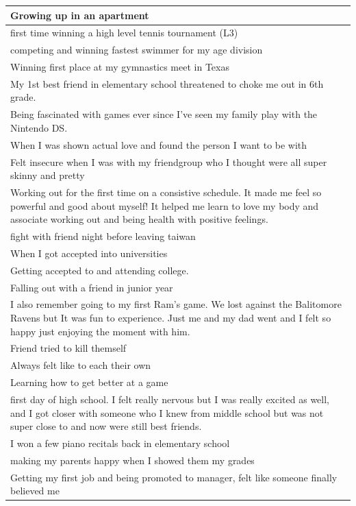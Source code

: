 \documentclass[
  .7em,
  letterpaper,
  DIV=11,
  numbers=noendperiod]{scrartcl}
\begin{document}
\begin{table}
\begin{tabular}{l}
\hline
Growing up in an apartment\\
\hline
first time winning a high level tennis tournament (L3)\\
\hline
competing and winning fastest swimmer for my age division\\
\hline
Winning first place at my gymnastics meet in Texas\\
\hline
My 1st best friend in elementary school threatened to choke me out in 6th grade.\\
\hline
Being fascinated with games ever since I've seen my family play with the Nintendo DS.\\
\hline
When I was shown actual love and found the person I want to be with\\
\hline
Felt insecure when I was with my friendgroup who I thought were all super skinny and pretty\\
\hline
Working out for the first time on a consistive schedule. It made me feel so powerful and good about myself! It helped me learn to love my body and associate working out and being health with positive feelings.\\
\hline
fight with friend night before leaving taiwan\\
\hline
When I got accepted into universities\\
\hline
Getting accepted to and attending college.\\
\hline
Falling out with a friend in junior year\\
\hline
I also remember going to my first Ram's game. We lost against the Balitomore Ravens but It was fun to experience. Just me and my dad went and I felt so happy just enjoying the moment with him.\\
\hline
Friend tried to kill themself\\
\hline
Always felt like to each their own\\
\hline
Learning how to get better at a game\\
\hline
first day of high school. I felt really nervous but I was really excited as well, and I got closer with someone who I knew from middle school but was not super close to and now were still best friends.\\
\hline
I won a few piano recitals back in elementary school\\
\hline
making my parents happy when I showed them my grades\\
\hline
Getting my first job and being promoted to manager, felt like someone finally believed me\\

\end{tabular}
\end{table}
\end{document}
